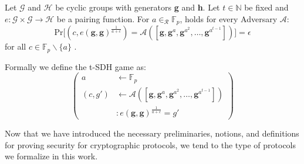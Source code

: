 \begin{definition}
    \label{tBSDH_def}
    Let $\mathcal{G}$ and $\mathcal{H}$ be cyclic groups with generators \textbf{g} and \textbf{h}.
    Let $t \in \mathbb{N}$ be fixed and $e: \mathcal{G} \times \mathcal{G} \rightarrow \mathcal{H}$ be a pairing function.  For $a \in_{\mathcal{R}} \mathbb{F}_p$, holds for every Adversary $\mathcal{A}:$
    \begin{equation*}
        \text{Pr}\big[
            (c,e(\textbf{g}, \textbf{g} )^{\frac{1}{a+c}}) = \mathcal{A}([\textbf{g},\textbf{g}^a,\textbf{g}^{a^2},\dots, \textbf{g}^{a^{t-1}}])
        \big] = \epsilon
    \end{equation*}
    for all $c \in \mathbb{F}_p\backslash \{a\}$ \parencite{KZG}.
    
    Formally we define the t-SDH game as: 
    \begin{equation*}
        \left(
            \begin{aligned}
                a & \leftarrow \mathbb{F}_p \\
                (c,g') & \leftarrow \mathcal{A}([\textbf{g},\textbf{g}^a,\textbf{g}^{a^2},\dots, \textbf{g}^{a^{t-1}}]) \\
                & : e(\textbf{g}, \textbf{g})^{\frac{1}{a+c}} = g'
            \end{aligned}
        \right)
    \end{equation*}
\end{definition}

Now that we have introduced the necessary preliminaries, notions, and definitions for proving security for cryptographic protocols, we tend to the type of protocols we formalize in this work.

